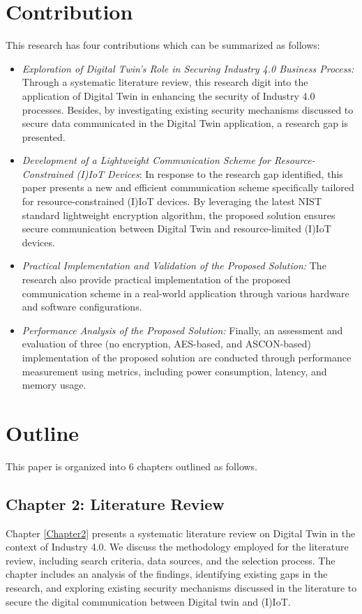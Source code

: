\section{Contribution}
This research has four contributions which can be summarized as follows:
\begin{itemize}
    \item \textit{Exploration of Digital Twin's Role in Securing Industry 4.0 Business Process:} Through a systematic literature review, this research digit into the application of Digital Twin in enhancing the security of Industry 4.0 processes. Besides, by investigating existing security mechanisms discussed to secure data communicated in the Digital Twin application, a research gap is presented.   
    \item \textit{Development of a Lightweight Communication Scheme for Resource-Constrained (I)IoT Devices}: In response to the research gap identified, this paper presents a new and efficient communication scheme specifically tailored for resource-constrained (I)IoT devices. By leveraging the latest NIST standard lightweight encryption algorithm, the proposed solution ensures secure communication between Digital Twin and resource-limited (I)IoT devices. 
    \item \textit{Practical Implementation and Validation of the Proposed Solution:} The research also provide practical implementation of the proposed communication scheme in a real-world application through various hardware and software configurations. 
    \item \textit{Performance Analysis of the Proposed Solution:} Finally, an assessment and evaluation of three (no encryption, AES-based, and ASCON-based) implementation of the proposed solution are conducted through performance measurement using metrics, including power consumption, latency, and memory usage.
\end{itemize}

\section{Outline}
This paper is organized into 6 chapters outlined as follows. 
\subsection{Chapter 2: Literature Review}
Chapter \ref{Chapter2} presents a systematic literature review on Digital Twin in the context of Industry 4.0. We discuss the methodology employed for the literature review, including search criteria, data sources, and the selection process. The chapter includes an analysis of the findings, identifying existing gaps in the research, and exploring existing security mechanisms discussed in the literature to secure the digital communication between Digital twin and (I)IoT.

